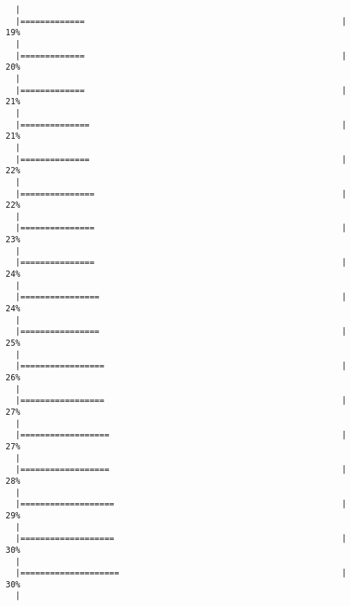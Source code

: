 \begin{knitrout}
\begin{kframe}
\begin{verbatim}
  |                                                                       
  |=============                                                    |  19%
  |                                                                       
  |=============                                                    |  20%
  |                                                                       
  |=============                                                    |  21%
  |                                                                       
  |==============                                                   |  21%
  |                                                                       
  |==============                                                   |  22%
  |                                                                       
  |===============                                                  |  22%
  |                                                                       
  |===============                                                  |  23%
  |                                                                       
  |===============                                                  |  24%
  |                                                                       
  |================                                                 |  24%
  |                                                                       
  |================                                                 |  25%
  |                                                                       
  |=================                                                |  26%
  |                                                                       
  |=================                                                |  27%
  |                                                                       
  |==================                                               |  27%
  |                                                                       
  |==================                                               |  28%
  |                                                                       
  |===================                                              |  29%
  |                                                                       
  |===================                                              |  30%
  |                                                                       
  |====================                                             |  30%
  |                                                                       

\end{verbatim}
\end{kframe}
\end{knitrout}
